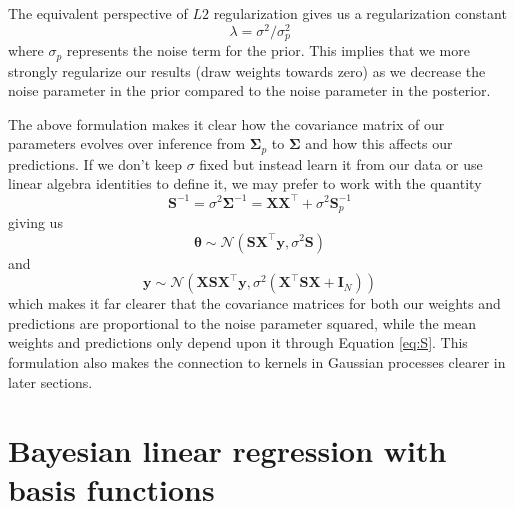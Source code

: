 \documentclass{article}
\begin{document}
The equivalent perspective of $L2$ regularization gives us a regularization constant \begin{equation}\label{eq:lambda}\lambda=\sigma^2/\sigma_p^2\end{equation} where $\sigma_p$ represents the noise term for the prior. This implies that we more strongly regularize our results (draw weights towards zero) as we decrease the noise parameter in the prior compared to the noise parameter in the posterior. 

The above formulation makes it clear how the covariance matrix of our parameters evolves over inference from $\boldsymbol{\Sigma}_p$ to $\boldsymbol{\Sigma}$ and how this affects our predictions. If we don't keep $\sigma$ fixed but instead learn it from our data or use linear algebra identities to define it, we may prefer to work with the quantity 
\begin{equation}
\label{eq:S}
    \mathbf{S}^{-1} = \sigma^2\boldsymbol{\Sigma}^{-1}=\mathbf{XX}^\top + \sigma^2\mathbf{S}_p^{-1}
\end{equation}
giving us
\begin{equation}
    \boldsymbol{\theta}\sim\mathcal{N}( \mathbf{S} \mathbf{X}^\top \mathbf{y},\sigma^2\mathbf{S})
\end{equation} 
and
\begin{equation}
    \mathbf{y}\sim\mathcal{N}\left(\mathbf{X}  \mathbf{S} \mathbf{X}^\top \mathbf{y} ,\sigma^2\left(\mathbf{X}^\top \mathbf{S}\mathbf{X} + \mathbf{I}_N\right)\right)
\end{equation}
which makes it far clearer that the covariance matrices for both our weights and predictions are proportional to the noise parameter squared, while the mean weights and predictions only depend upon it through Equation \ref{eq:S}. This formulation also makes the connection to kernels in Gaussian processes clearer in later sections.


\section{Bayesian linear regression with basis functions}
\end{document}
